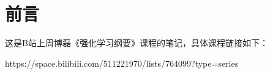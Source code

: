 \chapter*{前言}

这是B站上周博磊《强化学习纲要》课程的笔记，具体课程链接如下：

https://space.bilibili.com/511221970/lists/764099?type=series